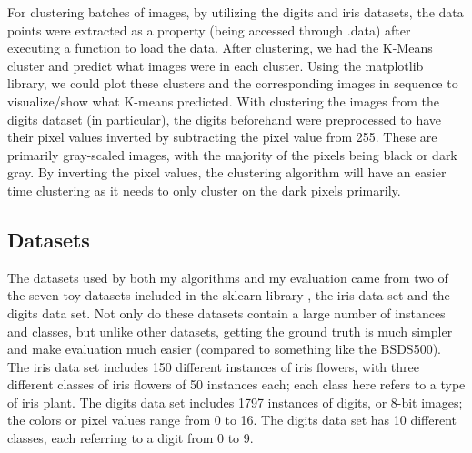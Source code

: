 \documentclass[10pt,twocolumn]{article}
\begin{document}

For clustering batches of images, by utilizing the digits and iris datasets, the data points were extracted as a property (being accessed through .data) after executing a function to load the data. After clustering, we had the K-Means cluster and predict what images were in each cluster. Using the matplotlib library, we could plot these clusters and the corresponding images in sequence to visualize/show what K-means predicted. With clustering the images from the digits dataset (in particular), the digits beforehand were preprocessed to have their pixel values inverted by subtracting the pixel value from 255. These are primarily gray-scaled images, with the majority of the pixels being black or dark gray. By inverting the pixel values, the clustering algorithm will have an easier time clustering as it needs to only cluster on the dark pixels primarily.

\subsection {Datasets}

The datasets used by both my algorithms and my evaluation came from two of the seven toy datasets included in the sklearn library \cite{skLearn2020}, the iris data set and the digits data set. Not only do these datasets contain a large number of instances and classes, but unlike other datasets, getting the ground truth is much simpler and make evaluation much easier (compared to something like the BSDS500). The iris data set includes 150 different instances of iris flowers, with three different classes of iris flowers of 50 instances each; each class here refers to a type of iris plant. The digits data set includes 1797 instances of digits, or 8-bit images; the colors or pixel values range from 0 to 16. The digits data set has 10 different classes, each referring to a digit from 0 to 9. 
\end{document}
